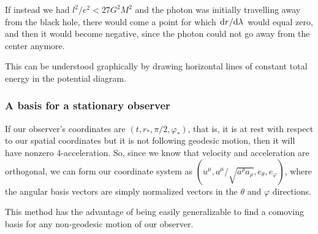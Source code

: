 \documentclass[main.tex]{subfiles}
\begin{document}
If instead we had \(l^2/e^2 < 27G^2M^2\) and the photon was initially travelling away from the black hole, there would come a point for which \(\dv*{r}{\lambda }\) would equal zero, and then it would become negative, since the photon could not go away from the center anymore. 

This can be understood graphically by drawing horizontal lines of constant total energy in the potential diagram. 

\subsubsection{A basis for a stationary observer}

If our observer's coordinates are \((t, r_{*}, \pi /2 , \varphi_{*} )\), that is, it is at rest with respect to our spatial coordinates but it is not following geodesic motion, then it will have nonzero 4-acceleration. So, since we know that velocity and acceleration are orthogonal, we can form our coordinate system as \((u^{\mu }, a^{\mu } / \sqrt{ a^{\rho } a_{\rho }}, e_{\theta }, e_{\varphi })\), where the angular basis vectors are simply normalized vectors in the \(\theta \) and \(\varphi \) directions.

This method has the advantage of being easily generalizable to find a comoving basis for any non-geodesic motion of our observer. 
\end{document}
